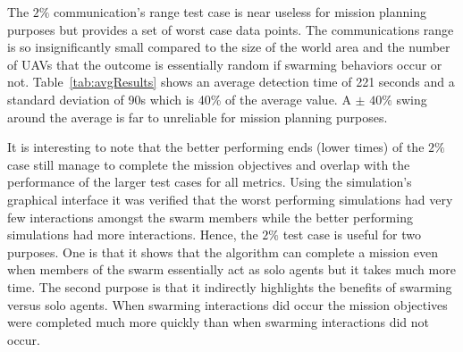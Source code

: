 \begin{multicols*}{2}
The $2\%$ communication's range test case is near useless for mission planning purposes but provides a set of worst case data points.  The communications range is so insignificantly small compared to the size of the world area and the number of UAVs that the outcome is essentially random if swarming behaviors occur or not.  Table~\ref{tab:avgResults} shows an average detection time of 221 seconds and a standard deviation of 90s which is 40\% of the average value.  A $\pm$ $40\%$ swing around the average is far to unreliable for mission planning purposes.

It is interesting to note that the better performing ends (lower times) of the $2\%$ case still manage to complete the mission objectives and overlap with the performance of the larger test cases for all metrics. Using the simulation's graphical interface it was verified that the worst performing simulations had very few interactions amongst the swarm members while the better performing simulations had more interactions.  Hence, the $2\%$ test case is useful for two purposes.  One is that it shows that the algorithm can complete a mission even when members of the swarm essentially act as solo agents but it takes much more time.  The second purpose is that it indirectly highlights the benefits of swarming versus solo agents.  When swarming interactions did occur the mission objectives were completed much more quickly than when swarming interactions did not occur.







\end{multicols*}
